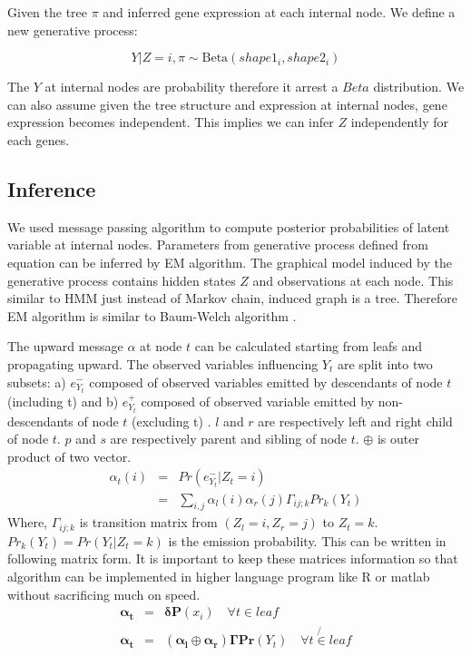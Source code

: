 \documentclass{article}
\begin{document}
Given the tree $\pi$ and inferred gene expression at each internal node. We define a new generative process:

\begin{equation}
	Y|Z = i, \pi \sim \text{Beta}(shape1_i,  shape2_i)
	\label{eqn:gen2}
\end{equation}

The $Y$ at internal nodes are probability therefore it arrest a $Beta$ distribution. We can also assume given
the tree structure and expression at internal nodes, gene expression becomes independent. This implies
we can infer $Z$ independently for each genes. 

\subsection{Inference}
We used message passing algorithm to compute posterior probabilities of latent variable at internal nodes.
Parameters from generative process defined from equation can be inferred by EM algorithm. 
The graphical model induced by the generative process contains hidden states $Z$ and observations at
each node. This similar to HMM just instead of Markov chain, induced graph is a tree. Therefore EM algorithm 
is similar to Baum-Welch algorithm \cite{rabiner1986introduction}. 


The upward message $\alpha$ at node $t$ can be calculated starting from leafs and propagating upward. 
The observed variables influencing $Y_t$ are split into two subsets:
a) $e_{Y_t}^-$ composed of observed variables emitted by descendants of node $t$ (including t)  and
b) $e_{Y_t}^+$ composed of observed variable emitted by non-descendants of node $t$ (excluding t) \cite{starr2004introduction}.
$l$ and $r$ are respectively left and right child of node $t$.
$p$ and $s$ are respectively parent and sibling of node $t$.
$\oplus$ is outer product of two vector.
\begin{eqnarray}
	\alpha_t(i) &=& Pr(e_{Y_t}^- |Z_t=i) \nonumber\\
	 &=& \sum_{i,j} \alpha_{l}(i) \alpha_{r}(j) \Gamma_{ij;k}  Pr_k(Y_t) \nonumber 
\end{eqnarray}
Where, $\Gamma_{ij;k}$ is transition matrix from $(Z_l = i , Z_r=j) $ to $Z_t=k$. $Pr_k(Y_t) = Pr(Y_t|Z_t =k)$
is the emission probability.
This can be written in following matrix form. It is important to keep these matrices information so that algorithm can be 
implemented in higher language program like R or matlab without sacrificing much on speed.
\begin{eqnarray}
	\boldsymbol{\alpha_t} &=& \boldsymbol{\delta P}(x_i)  \quad \forall t \in \textit{leaf} \nonumber\\ 
	\boldsymbol{\alpha_t} &=& \boldsymbol{(\alpha_l \oplus \alpha_r) \Gamma Pr}(Y_t)  \quad\forall t \not{\in} \textit{leaf}
	\label{eqn:alpha}
\end{eqnarray}
\end{document}
